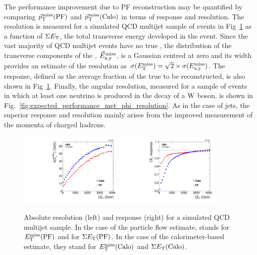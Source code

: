 The performance improvement due to PF reconstruction may be
quantified by comparing ${\vec p}_{\mathrm{T}}^{\kern1pt\text{miss}}(\mathrm{PF})$ and
${\vec p}_{\mathrm{T}}^{\kern1pt\text{miss}}(\mathrm{Calo})$ in terms of \MET response and
resolution. The \MET resolution is measured for a simulated QCD
multijet sample of events in Fig~\ref{fig:expected_performance_met} as a function of $\Sigma E_\textrm{T}$, the total
transverse energy developed in the event. Since the vast majority of
QCD multijet events have no true \MET, the distribution of the
transverse components of the \vecMET, $\vec{E}_\textrm{x,y}^\textrm{\kern0.10em miss}$, is a Gaussian centred at
zero and its width provides an estimate of the \MET resolution as $\sigma(E_{\mathrm{T}}^{\text{miss}})=\sqrt{2} \times
\sigma(E_\textrm{x,y}^\textrm{miss})$. The \sumET response, defined as the average fraction of the true \sumET to
be reconstructed, is also shown in Fig~\ref{fig:expected_performance_met}. Finally, the \vecMET
angular resolution, measured for a sample of \ttbar events in which at
least one neutrino is produced in the decay of a $\mathrm{W}$ boson, is shown
in Fig.~\ref{fig:expected_performance_met_phi_resolution}.  As in
the case of jets, the superior response and resolution mainly arises
from the improved measurement of the momenta of charged hadrons.


\begin{figure}[htbp]
\centering
\includegraphics[width=0.45\textwidth]{figs/cms/met_sigma_vs_sumet.pdf}
\includegraphics[width=0.45\textwidth]{figs/cms/met_response_vs_sumet.pdf}
\caption{Absolute \MET resolution (left) and \sumET response (right) for a simulated QCD multijet sample.
In the case of the particle flow estimate, \MET stands for $E_{\mathrm{T}}^{\text{miss}} ({\mathrm{PF}})$ and \sumET for $\Sigma E_\textrm{T} ({\mathrm{PF}})$. In the case of the calorimeter-based estimate, they stand for $E_{\mathrm{T}}^{\text{miss}} ({\mathrm{Calo}})$ and $\Sigma E_\textrm{T} ({\mathrm{Calo}})$.\label{fig:expected_performance_met}}
\end{figure}

